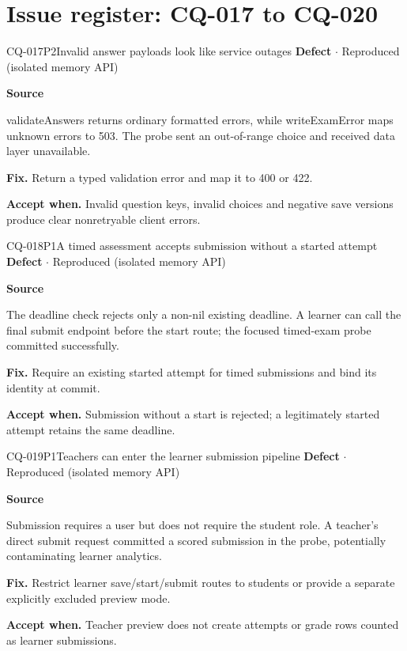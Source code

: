 \section*{Issue register: CQ-017 to CQ-020}
\begin{finding}{CQ-017}{P2}{Invalid answer payloads look like service outages}
\textbf{Defect} $\cdot$ Reproduced (isolated memory API)\par
\textbf{Source}\quad{}\par
validateAnswers returns ordinary formatted errors, while writeExamError maps unknown errors to 503. The probe sent an out-of-range choice and received data layer unavailable.\par
\textbf{Fix.} Return a typed validation error and map it to 400 or 422.\par
\textbf{Accept when.} Invalid question keys, invalid choices and negative save versions produce clear nonretryable client errors.
\end{finding}
\begin{finding}{CQ-018}{P1}{A timed assessment accepts submission without a started attempt}
\textbf{Defect} $\cdot$ Reproduced (isolated memory API)\par
\textbf{Source}\quad{}\par
The deadline check rejects only a non-nil existing deadline. A learner can call the final submit endpoint before the start route; the focused timed-exam probe committed successfully.\par
\textbf{Fix.} Require an existing started attempt for timed submissions and bind its identity at commit.\par
\textbf{Accept when.} Submission without a start is rejected; a legitimately started attempt retains the same deadline.
\end{finding}
\begin{finding}{CQ-019}{P1}{Teachers can enter the learner submission pipeline}
\textbf{Defect} $\cdot$ Reproduced (isolated memory API)\par
\textbf{Source}\quad{}\par
Submission requires a user but does not require the student role. A teacher's direct submit request committed a scored submission in the probe, potentially contaminating learner analytics.\par
\textbf{Fix.} Restrict learner save/start/submit routes to students or provide a separate explicitly excluded preview mode.\par
\textbf{Accept when.} Teacher preview does not create attempts or grade rows counted as learner submissions.
\end{finding}
